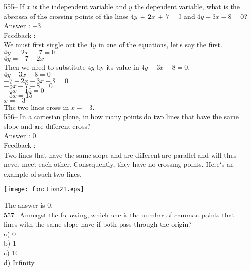 \documentclass[letterpaper, 12pt]{article}
\begin{document}
555-- If $x$ is the independent variable and $y$ the dependent variable,
what is the abscissa of the crossing points of the lines
$4y\,+\,2x\,+\,7=0$ and $4y-3x-8=0$?\\

Answer : $-3$\\

Feedback : \\
We must first single out the $4y$ in one of the equations, let`s say the first.\\
$4y\,+\,2x\,+\,7=0$\\
$4y=-7-2x$\\

Then we need to substitute $4y$ by its value in $4y-3x-8=0$.\\
$4y-3x-8=0$\\
$-7-2x-3x-8=0$\\
$-5x-7-8=0$\\
$-5x-15=0$\\
$-5x=15$\\
$x=-3$\\
The two lines cross in $x=-3$.\\

556-- In a cartesian plane, in how many points do two lines that have the same slope and are different cross?\\

Answer : 0\\

Feedback :\\
Two lines that have the same slope and are different are parallel and will thus never meet each other. Consequently, they have no crossing points.  Here`s an example of such two lines.\\
    \begin{center}
    \texttt{[image: fonction21.eps]}
    \end{center}

The answer is 0.\\



557-- Amongst the following, which one is the number of common points that lines with the same slope have if both pass through the origin?\\
a) 0\\
b) 1\\
c) 10\\
d) Infinity\\
\end{document}
